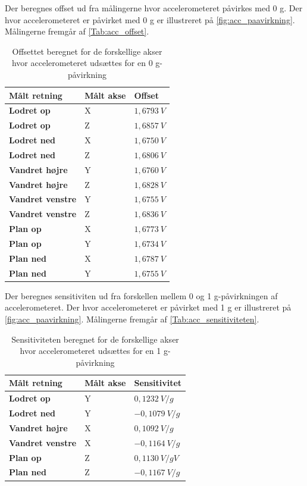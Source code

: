 Der beregnes offset ud fra målingerne hvor accelerometeret påvirkes med 0 g. Der hvor accelerometeret er påvirket med 0 g er illustreret på \autoref{fig:acc_paavirkning}. Målingerne fremgår af \autoref{Tab:acc_offset}. 

\begin{table}[H]
	\centering
	\begin{tabular}{|l|l|l|}
	\textbf{Målt retning} & \textbf{Målt akse} & \textbf{Offset} \\ \hline
    \textbf{Lodret op} 		& X 		& $1,6793~V$ 	\\ \hline
    \textbf{Lodret op} 		& Z 		& $1,6857~V$ 	 \\ \hline
    \textbf{Lodret ned}		& X 		& $1,6750~V$ 	\\ \hline
    \textbf{Lodret ned}		& Z 		& $1,6806~V$  	\\ \hline
    \textbf{Vandret højre} 	& Y 		& $1,6760~V$    \\ \hline     
    \textbf{Vandret højre} 	& Z 		& $1,6828~V$ 	\\ \hline
    \textbf{Vandret venstre}	& Y 		& $1,6755~V$ 	\\ \hline
    \textbf{Vandret venstre}	& Z 		& $1,6836~V$		\\ \hline
    \textbf{Plan op} 		& X 		& $1,6773~V$		\\ \hline		
    \textbf{Plan op} 		& Y 		& $1,6734~V$    \\ \hline
    \textbf{Plan ned} 		& X 		& $1,6787~V$		\\ \hline
    \textbf{Plan ned} 		& Y 		& $1,6755~V$		\\ \hline
	\end{tabular}
	\caption{Offsettet beregnet for de forskellige akser hvor accelerometeret udsættes for en 0 g-påvirkning}
	\label{Tab:acc_offset}
\end{table}

Der beregnes sensitiviten ud fra forskellen mellem 0 og 1 g-påvirkningen af accelerometeret. Der hvor accelerometeret er påvirket med 1 g er illustreret på \autoref{fig:acc_paavirkning}. Målingerne fremgår af \autoref{Tab:acc_sensitiviteten}. 

\begin{table}[H]
	\centering
	\begin{tabular}{|l|l|l|}
	\textbf{Målt retning} & \textbf{Målt akse} & \textbf{Sensitivitet} \\ \hline
    \textbf{Lodret op} 		& Y		& $0,1232~V/g$ 	\\ \hline
    \textbf{Lodret ned}		& Y 		& $-0,1079~V/g$ 	\\ \hline
    \textbf{Vandret højre} 	& X 		& $0,1092~V/g$     \\ \hline     
    \textbf{Vandret venstre}	& X 		& $-0,1164~V/g$ 	\\ \hline
    \textbf{Plan op} 		& Z 		& $0,1130~V/gV$    	\\ \hline		
    \textbf{Plan ned} 		& Z 		& $-0,1167~V/g$		\\ \hline
	\end{tabular}
	\caption{Sensitiviteten beregnet for de forskellige akser hvor accelerometeret udsættes for en 1 g-påvirkning}
	\label{Tab:acc_offset}
\end{table}

